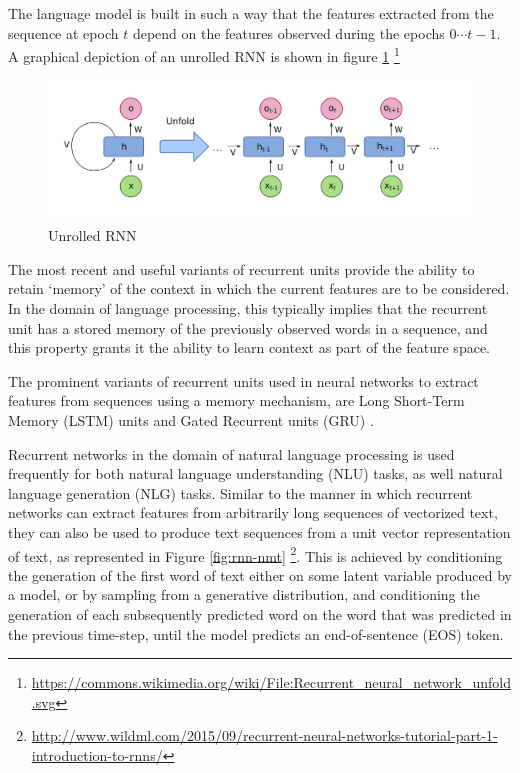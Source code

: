 The language model is built in such a way that the features extracted from the sequence at epoch $t$ depend on the features observed during the epochs $0 \cdots t-1$. A graphical depiction of an unrolled RNN is shown in figure \ref{fig:recurrent-neural-network-unfold} \footnote{\url{https://commons.wikimedia.org/wiki/File:Recurrent_neural_network_unfold.svg}}

\begin{figure}[ht]
	\centering
	\includegraphics[width=.8\textwidth]{images/recurrent-neural-network-unfold}
	\caption{\label{fig:recurrent-neural-network-unfold} Unrolled RNN}
\end{figure}

The most recent and useful variants of recurrent units provide the ability to retain `memory' of the context in which the current features are to be considered. In the domain of language processing, this typically implies that the recurrent unit has a stored memory of the previously observed words in a sequence, and this property grants it the ability to learn context as part of the feature space.

The prominent variants of recurrent units used in neural networks to extract features from sequences using a memory mechanism, are Long Short-Term Memory (LSTM) units \citep{gers2001lstm} and Gated Recurrent units (GRU) \citep{chung2014empirical}.

Recurrent networks in the domain of natural language processing is used frequently for both natural language understanding (NLU) tasks, as well natural language generation (NLG) tasks. Similar to the manner in which recurrent networks can extract features from arbitrarily long sequences of vectorized text, they can also be used to produce text sequences from a unit vector representation of text, as represented in Figure \ref{fig:rnn-nmt} \footnote{\url{http://www.wildml.com/2015/09/recurrent-neural-networks-tutorial-part-1-introduction-to-rnns/}}. This is achieved by conditioning the generation of the first word of text either on some latent variable produced by a model, or by sampling from a generative distribution, and conditioning the generation of each subsequently predicted word on the word that was predicted in the previous time-step, until the model predicts an end-of-sentence (EOS) token.

